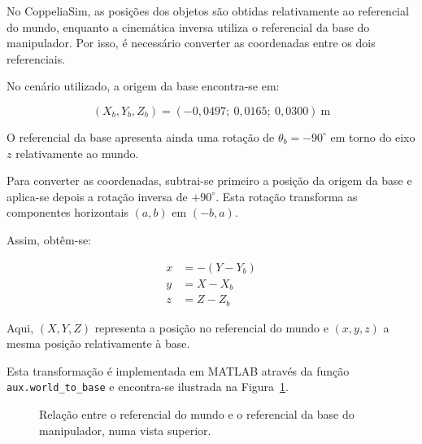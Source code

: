 No CoppeliaSim, as posições dos objetos são obtidas relativamente ao referencial do mundo, enquanto a cinemática inversa utiliza o referencial da base do manipulador. Por isso, é necessário converter as coordenadas entre os dois referenciais.

No cenário utilizado, a origem da base encontra-se em:

\begin{equation}
    (X_b,Y_b,Z_b)=
    (-0{,}0497;\ 0{,}0165;\ 0{,}0300)
    \ \text{m}
\end{equation}

O referencial da base apresenta ainda uma rotação de $\theta_b=-90^\circ$ em torno do eixo $z$ relativamente ao mundo.

Para converter as coordenadas, subtrai-se primeiro a posição da origem da base e aplica-se depois a rotação inversa de $+90^\circ$. Esta rotação transforma as componentes horizontais $(a,b)$ em $(-b,a)$.

Assim, obtêm-se:

\begin{equation}
    \boxed{
    \begin{aligned}
        x &= -(Y-Y_b)\\
        y &= X-X_b\\
        z &= Z-Z_b
    \end{aligned}
    }
    \label{eq:mundo_base}
\end{equation}

Aqui, $(X,Y,Z)$ representa a posição no referencial do mundo e $(x,y,z)$ a mesma posição relativamente à base.

Esta transformação é implementada em MATLAB através da função \texttt{aux.world\_to\_base} e encontra-se ilustrada na Figura~\ref{fig:mundo_base}.

\begin{figure}[htbp]
    \centering
    \resizebox{0.6\textwidth}{!}{
        
    }
    \caption{Relação entre o referencial do mundo e o referencial da base do manipulador, numa vista superior.}
    \label{fig:mundo_base}
\end{figure}



%

